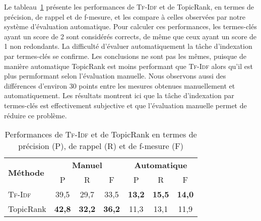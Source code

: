         Le
        tableau~\ref{tab:main-automatic_evaluation_of_keyphrase_annotation-results-topicrank-prf}
        présente les performances de \textsc{Tf-Idf} et de TopicRank, en termes
        de précision, de rappel et de f-mesure, et les compare à celles
        observées par notre système d'évaluation automatique. Pour calculer ces
        performances, les termes-clés ayant un score de 2 sont considérés
        corrects, de même que ceux ayant un score de 1 non redondants. La
        difficulté d'évaluer automatiquement la tâche d'indexation par
        termes-clés se confirme. Les conclusions ne sont pas les mêmes, puisque
        de manière automatique TopicRank est moins performant que
        \textsc{Tf-Idf} alors qu'il est plus permformant selon l'évaluation
        manuelle. Nous observons aussi des différences d'environ 30 points entre
        les mesures obtenues manuellement et automatiquement. Les résultats
        montrent ici que la tâche d'indexation par termes-clés est effectivement
        subjective et que l'évaluation manuelle permet de réduire ce problème.
        \begin{table}[h!]
          \centering
          \begin{tabular}{l|ccc|ccc}
            \toprule
            \multirow{2}{*}{\textbf{Méthode}} & \multicolumn{3}{c|}{\textbf{Manuel}} & \multicolumn{3}{c}{\textbf{Automatique}}\\
            \cline{2-7}
            & P & R & F & P & R & F\\
            \hline
            \textsc{Tf-Idf} & 39,5 & 29,7 & 33,5 & \textbf{13,2} & \textbf{15,5} & \textbf{14,0}\\
            TopicRank & \textbf{42,8} & \textbf{32,2} & \textbf{36,2} & 11,3 & 13,1 & 11,9\\
            \bottomrule
          \end{tabular}
          \caption[
            Performances de \textsc{Tf-Idf} et de TopicRank en termes de
            précision, de rappel et de f-mesure
          ]{
            Performances de \textsc{Tf-Idf} et de TopicRank en termes de
            précision (P), de rappel (R) et de f-mesure (F)
            \label{tab:main-automatic_evaluation_of_keyphrase_annotation-results-topicrank-prf}}
        \end{table}
    
